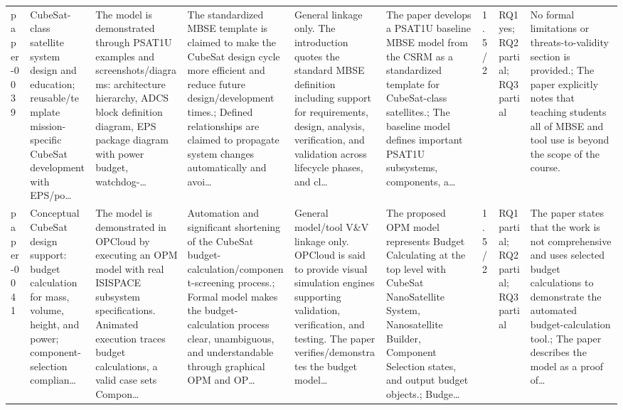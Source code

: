 \documentclass[10pt]{article}
\begin{document}
\begin{landscape}
\begin{longtable}{p{1.0cm}p{2.4cm}p{3.1cm}p{3.7cm}p{3.4cm}p{3.1cm}p{1.0cm}p{1.8cm}p{3.4cm}}
paper-0039 & CubeSat-class satellite system design and education; reusable/template mission-specific CubeSat development with EPS/po… & The model is demonstrated through PSAT1U examples and screenshots/diagrams: architecture hierarchy, ADCS block definition diagram, EPS package diagram with power budget, watchdog-… & The standardized MBSE template is claimed to make the CubeSat design cycle more efficient and reduce future design/development times.; Defined relationships are claimed to propagate system changes automatically and avoi… & General linkage only. The introduction quotes the standard MBSE definition including support for requirements, design, analysis, verification, and validation across lifecycle phases, and cl… & The paper develops a PSAT1U baseline MBSE model from the CSRM as a standardized template for CubeSat-class satellites.; The baseline model defines important PSAT1U subsystems, components, a… & 1.5/2 & RQ1 yes; RQ2 partial; RQ3 partial & No formal limitations or threats-to-validity section is provided.; The paper explicitly notes that teaching students all of MBSE and tool use is beyond the scope of the course. \\
paper-0041 & Conceptual CubeSat design support: budget calculation for mass, volume, height, and power; component-selection complian… & The model is demonstrated in OPCloud by executing an OPM model with real ISISPACE subsystem specifications. Animated execution traces budget calculations, a valid case sets Compon… & Automation and significant shortening of the CubeSat budget-calculation/component-screening process.; Formal model makes the budget-calculation process clear, unambiguous, and understandable through graphical OPM and OP… & General model/tool V\&V linkage only. OPCloud is said to provide visual simulation engines supporting validation, verification, and testing. The paper verifies/demonstrates the budget model… & The proposed OPM model represents Budget Calculating at the top level with CubeSat NanoSatellite System, Nanosatellite Builder, Component Selection states, and output budget objects.; Budge… & 1.5/2 & RQ1 partial; RQ2 partial; RQ3 partial & The paper states that the work is not comprehensive and uses selected budget calculations to demonstrate the automated budget-calculation tool.; The paper describes the model as a proof of… \\

\end{longtable}
\end{landscape}
\end{document}
